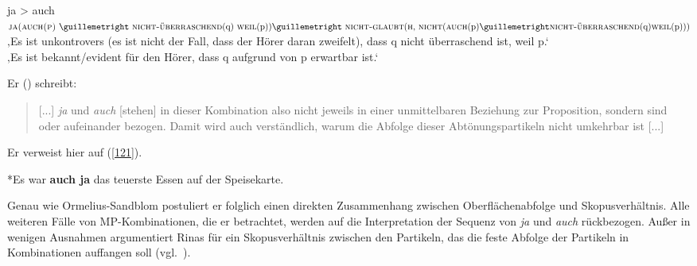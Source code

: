 \begin{exe}
	\ex\label{120} 
		ja \textgreater\xspace auch\\
		$\textsc{ja(\textsc{auch}(p)} \  » \ \textrm{\textsc{nicht-überraschend}(q) \textsc{weil}(p))} \\ » \ \textrm{\textsc{nicht-glaubt}(\textsc{h}, \textsc{nicht}(\textsc{auch}(p)} » \\ 					\textrm{\textsc{nicht-überraschend}(q)\textsc{weil}(p)))}$\\
		‚Es ist unkontrovers (es ist nicht der Fall, dass der Hörer daran zweifelt), dass q nicht überraschend ist, weil p.‘\\
		‚Es ist bekannt/evident für den Hörer, dass q aufgrund von p erwartbar ist.‘ 
		\hbox{}\hfill\hbox{\citet[425]{Rinas2007}}
\end{exe}
Er (\citeyear[425]{Rinas2007}) schreibt: 
\begin{quotation}
[...] \textit{ja} und \textit{auch} [stehen] in dieser Kombination also nicht jeweils in einer unmittelbaren Beziehung zur Proposition, sondern sind    oder    aufeinander bezogen. Damit wird auch verständlich, wa\-rum die Abfolge dieser Abtönungspartikeln nicht umkehrbar ist [...]
\end{quotation}
Er verweist hier auf (\ref{121}).

\begin{exe}
	\ex\label{121} 
	*Es war \textbf{auch ja} das teuerste Essen auf der Speisekarte.\\
	\hbox{}\hfill\hbox{\citet[425]{Rinas2007}}
\end{exe}
Genau wie Ormelius-Sandblom postuliert er folglich einen direkten Zusammenhang zwischen Oberflächenabfolge und Skopusverhältnis. Alle weiteren Fälle von MP-Kom\-bi\-na\-ti\-on\-en, die er betrachtet, werden auf die Interpretation der Sequenz von \textit{ja} und \textit{auch} rückbezogen. Außer in wenigen Ausnahmen argumentiert Rinas für ein Skopusverhältnis zwischen den Partikeln, das die feste Abfolge der Partikeln in Kombinationen auffangen soll (vgl.\ \citeyear[432--448]{Rinas2007}).\\

